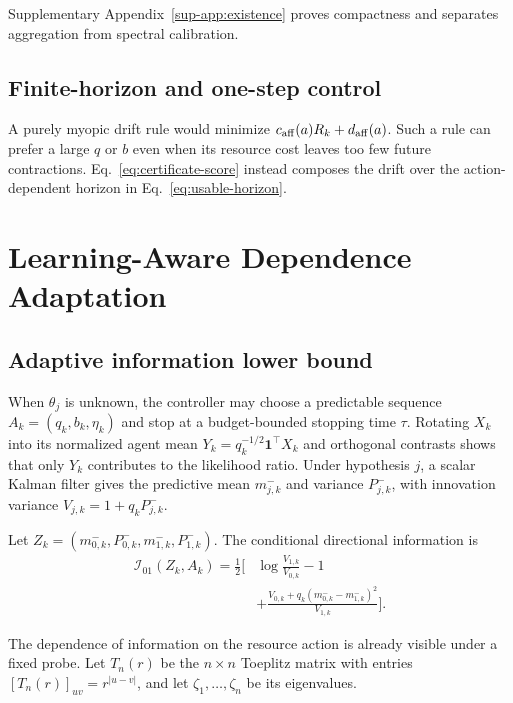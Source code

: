 \documentclass[journal]{IEEEtran}
\begin{document}
Supplementary Appendix~\ref{sup-app:existence} proves compactness and separates aggregation from spectral calibration.

\subsection{Finite-horizon and one-step control}
A purely myopic drift rule would minimize $c_{\rm aff}(a)R_k+d_{\rm aff}(a)$.
Such a rule can prefer a large $q$ or $b$ even when its resource cost leaves too few future contractions.
Eq.~\eqref{eq:certificate-score} instead composes the drift over the action-dependent horizon in Eq.~\eqref{eq:usable-horizon}.

\section{Learning-Aware Dependence Adaptation}
\subsection{Adaptive information lower bound}
When $\theta_j$ is unknown, the controller may choose a predictable sequence $A_k=(q_k,b_k,\eta_k)$ and stop at a budget-bounded stopping time $\tau$.
Rotating $X_k$ into its normalized agent mean $Y_k=q_k^{-1/2}\bm{1}^\top X_k$ and orthogonal contrasts shows that only $Y_k$ contributes to the likelihood ratio.
Under hypothesis $j$, a scalar Kalman filter gives the predictive mean $m^-_{j,k}$ and variance $P^-_{j,k}$, with innovation variance $V_{j,k}=1+q_kP^-_{j,k}$.

Let $Z_k=(m^-_{0,k},P^-_{0,k},m^-_{1,k},P^-_{1,k})$.
The conditional directional information is
\begin{equation}
\begin{aligned}
\mathcal{I}_{01}(Z_k,A_k)=\frac12\bigg[&\log\frac{V_{1,k}}{V_{0,k}}-1\\
&+\frac{V_{0,k}+q_k(m^-_{0,k}-m^-_{1,k})^2}{V_{1,k}}\bigg].
\end{aligned}
\label{eq:conditional-kl}
\end{equation}

The dependence of information on the resource action is already visible under a fixed probe.
Let $T_n(r)$ be the $n\times n$ Toeplitz matrix with entries $[T_n(r)]_{uv}=r^{|u-v|}$, and let $\zeta_1,\ldots,\zeta_n$ be its eigenvalues.
\end{document}
